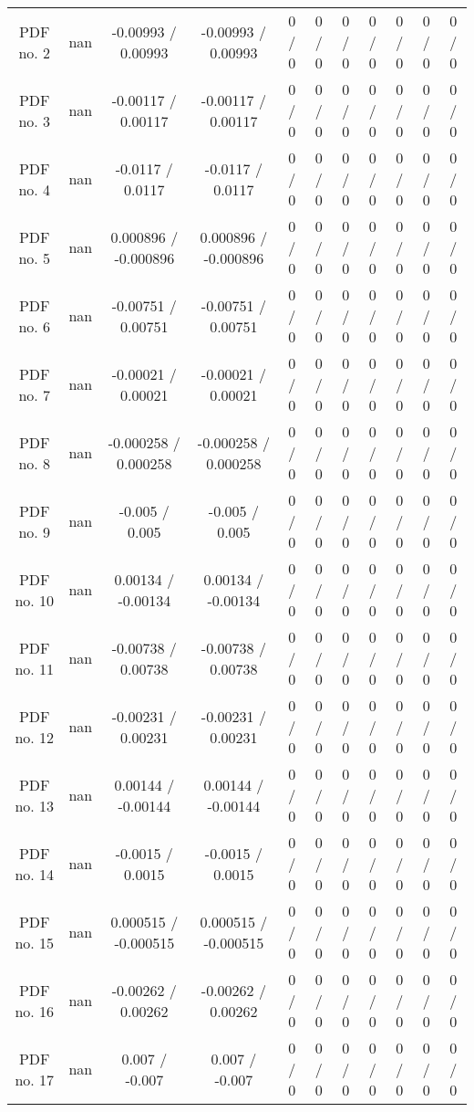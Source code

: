 \begin{table}[htbp]
\begin{center}
\begin{tabular}{|c|c|c|c|c|c|c|c|c|c|c|}
  PDF no. 2 &    nan    & -0.00993 / 0.00993 & -0.00993 / 0.00993 & 0 / 0 & 0 / 0 & 0 / 0 & 0 / 0 & 0 / 0 & 0 / 0 & 0 / 0 \\ 
  PDF no. 3 &    nan    & -0.00117 / 0.00117 & -0.00117 / 0.00117 & 0 / 0 & 0 / 0 & 0 / 0 & 0 / 0 & 0 / 0 & 0 / 0 & 0 / 0 \\ 
  PDF no. 4 &    nan    & -0.0117 / 0.0117 & -0.0117 / 0.0117 & 0 / 0 & 0 / 0 & 0 / 0 & 0 / 0 & 0 / 0 & 0 / 0 & 0 / 0 \\ 
  PDF no. 5 &    nan    & 0.000896 / -0.000896 & 0.000896 / -0.000896 & 0 / 0 & 0 / 0 & 0 / 0 & 0 / 0 & 0 / 0 & 0 / 0 & 0 / 0 \\ 
  PDF no. 6 &    nan    & -0.00751 / 0.00751 & -0.00751 / 0.00751 & 0 / 0 & 0 / 0 & 0 / 0 & 0 / 0 & 0 / 0 & 0 / 0 & 0 / 0 \\ 
  PDF no. 7 &    nan    & -0.00021 / 0.00021 & -0.00021 / 0.00021 & 0 / 0 & 0 / 0 & 0 / 0 & 0 / 0 & 0 / 0 & 0 / 0 & 0 / 0 \\ 
  PDF no. 8 &    nan    & -0.000258 / 0.000258 & -0.000258 / 0.000258 & 0 / 0 & 0 / 0 & 0 / 0 & 0 / 0 & 0 / 0 & 0 / 0 & 0 / 0 \\ 
  PDF no. 9 &    nan    & -0.005 / 0.005 & -0.005 / 0.005 & 0 / 0 & 0 / 0 & 0 / 0 & 0 / 0 & 0 / 0 & 0 / 0 & 0 / 0 \\ 
  PDF no. 10 &    nan    & 0.00134 / -0.00134 & 0.00134 / -0.00134 & 0 / 0 & 0 / 0 & 0 / 0 & 0 / 0 & 0 / 0 & 0 / 0 & 0 / 0 \\ 
  PDF no. 11 &    nan    & -0.00738 / 0.00738 & -0.00738 / 0.00738 & 0 / 0 & 0 / 0 & 0 / 0 & 0 / 0 & 0 / 0 & 0 / 0 & 0 / 0 \\ 
  PDF no. 12 &    nan    & -0.00231 / 0.00231 & -0.00231 / 0.00231 & 0 / 0 & 0 / 0 & 0 / 0 & 0 / 0 & 0 / 0 & 0 / 0 & 0 / 0 \\ 
  PDF no. 13 &    nan    & 0.00144 / -0.00144 & 0.00144 / -0.00144 & 0 / 0 & 0 / 0 & 0 / 0 & 0 / 0 & 0 / 0 & 0 / 0 & 0 / 0 \\ 
  PDF no. 14 &    nan    & -0.0015 / 0.0015 & -0.0015 / 0.0015 & 0 / 0 & 0 / 0 & 0 / 0 & 0 / 0 & 0 / 0 & 0 / 0 & 0 / 0 \\ 
  PDF no. 15 &    nan    & 0.000515 / -0.000515 & 0.000515 / -0.000515 & 0 / 0 & 0 / 0 & 0 / 0 & 0 / 0 & 0 / 0 & 0 / 0 & 0 / 0 \\ 
  PDF no. 16 &    nan    & -0.00262 / 0.00262 & -0.00262 / 0.00262 & 0 / 0 & 0 / 0 & 0 / 0 & 0 / 0 & 0 / 0 & 0 / 0 & 0 / 0 \\ 
  PDF no. 17 &    nan    & 0.007 / -0.007 & 0.007 / -0.007 & 0 / 0 & 0 / 0 & 0 / 0 & 0 / 0 & 0 / 0 & 0 / 0 & 0 / 0 \\ 

\end{tabular}
\end{center}
\end{table}
